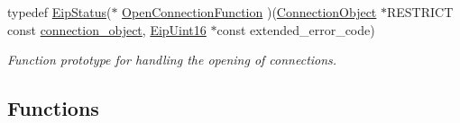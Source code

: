 \begin{DoxyCompactItemize}
typedef \hyperlink{typedefs_8h_a3dcc5f7837c120360f8cc88a76781709}{\-Eip\-Status}($\ast$ \hyperlink{group__CIP__API_gaba609aaaca108b8d1b24da1ccbd7b375}{\-Open\-Connection\-Function} )(\hyperlink{cipconnectionmanager_8h_a705e78f4613ecabcb6388951b73c4700}{\-Connection\-Object} $\ast$\-R\-E\-S\-T\-R\-I\-C\-T const \hyperlink{structconnection__object}{connection\-\_\-object}, \hyperlink{typedefs_8h_ac1b4cfa25b4f5def62f23b455dd395d8}{\-Eip\-Uint16} $\ast$const extended\-\_\-error\-\_\-code)
\begin{DoxyCompactList}\small\item\em \-Function prototype for handling the opening of connections. \end{DoxyCompactList}\end{DoxyCompactItemize}
\subsection*{\-Functions}
